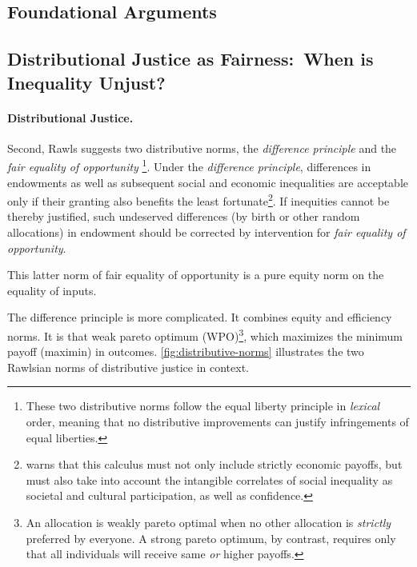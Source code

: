 

\subsection[Foundational Arguments]{Foundational Arguments}

\subsection[Distributional Justice (as Fairness)]{Distributional Justice as Fairness:~When is Inequality Unjust?}
\paragraph{Distributional Justice.} Second, Rawls suggests two distributive norms, the \emph{difference principle} and the \emph{fair equality of opportunity} \footnote{
	These two distributive norms follow the equal liberty principle in \emph{lexical} order, meaning that no distributive improvements can justify infringements of equal liberties.}.
Under the \emph{difference principle}, differences in endowments as well as subsequent social and economic inequalities are acceptable only if their granting also benefits the least fortunate\footnote{
	\cite[122]{Rawls-1971} warns that this calculus must not only include strictly economic payoffs, but must also take into account the intangible correlates of social inequality as societal and cultural participation, as well as confidence.}.
If inequities cannot be thereby justified, such undeserved differences (by birth or other random allocations) in endowment should be corrected by intervention for \emph{fair equality of opportunity}.

This latter norm of fair equality of opportunity is a pure equity norm on the equality of inputs.

The difference principle is more complicated.
It combines equity and efficiency norms.
It is that weak pareto optimum (WPO)\footnote{
	An allocation is weakly pareto optimal when no other allocation is \emph{strictly} preferred by everyone.
A strong pareto optimum, by contrast, requires only that all individuals will receive same \emph{or} higher payoffs.},
which maximizes the minimum payoff (maximin) in outcomes.
\autoref{fig:distributive-norms} illustrates the two Rawlsian norms of distributive justice in context.

